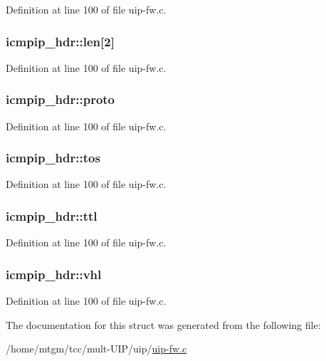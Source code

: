 Definition at line 100 of file uip-\/fw.c.

\hypertarget{structicmpip__hdr_add2b8a5dbb5175b67f271e7911100054}{
\subsubsection[{len}]{ {\bf icmpip\_\-hdr::len}\mbox{[}2\mbox{]}}}
\label{structicmpip__hdr_add2b8a5dbb5175b67f271e7911100054}


Definition at line 100 of file uip-\/fw.c.

\hypertarget{structicmpip__hdr_a96faf59c682cc8ae079e891d75e06146}{
\subsubsection[{proto}]{ {\bf icmpip\_\-hdr::proto}}}
\label{structicmpip__hdr_a96faf59c682cc8ae079e891d75e06146}


Definition at line 100 of file uip-\/fw.c.

\hypertarget{structicmpip__hdr_ad87c22fa359c38406c1aa1928ddba3b3}{
\subsubsection[{tos}]{ {\bf icmpip\_\-hdr::tos}}}
\label{structicmpip__hdr_ad87c22fa359c38406c1aa1928ddba3b3}


Definition at line 100 of file uip-\/fw.c.

\hypertarget{structicmpip__hdr_a6c843562192e126e97c8a694f676e251}{
\subsubsection[{ttl}]{ {\bf icmpip\_\-hdr::ttl}}}
\label{structicmpip__hdr_a6c843562192e126e97c8a694f676e251}


Definition at line 100 of file uip-\/fw.c.

\hypertarget{structicmpip__hdr_afdf7a84b0cb277c672ea4f53346465b1}{
\subsubsection[{vhl}]{ {\bf icmpip\_\-hdr::vhl}}}
\label{structicmpip__hdr_afdf7a84b0cb277c672ea4f53346465b1}


Definition at line 100 of file uip-\/fw.c.



The documentation for this struct was generated from the following file:\begin{DoxyCompactItemize}
\item 
/home/mtgm/tcc/mult-\/UIP/uip/\hyperlink{uip-fw_8c}{uip-\/fw.c}\end{DoxyCompactItemize}
